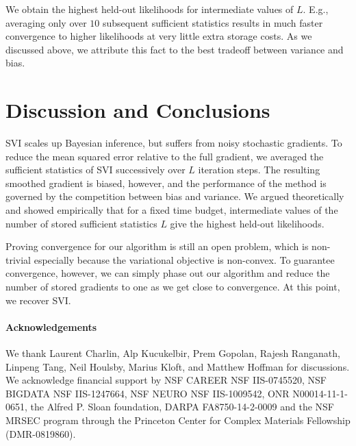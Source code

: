 \documentclass{article} %
\begin{document}
We obtain the highest held-out likelihoods for intermediate values of $L$. E.g., averaging only over $10$ subsequent sufficient statistics results in much faster convergence to higher likelihoods
at very little extra storage costs. As we discussed above, we attribute this fact to the best tradeoff between variance and bias.

\section{Discussion and Conclusions}
SVI scales up Bayesian inference, but suffers from noisy stochastic gradients.
To reduce the mean squared error relative to the full gradient, we averaged the sufficient statistics of SVI successively over $L$ iteration steps. The resulting smoothed gradient is biased, however, and the performance of the method
is governed by the competition between bias and variance. We argued theoretically and showed empirically that
for a fixed time budget, intermediate values of the number of stored sufficient statistics $L$ give the highest held-out likelihoods.

Proving convergence for our algorithm is still an open problem, which is non-trivial especially because the variational objective is non-convex.
To guarantee convergence, however, we can simply phase out our algorithm and reduce the number of stored gradients to one as we get close to convergence.  At this point, we recover SVI.

\paragraph{Acknowledgements} We thank Laurent Charlin, Alp Kucukelbir, Prem Gopolan, Rajesh Ranganath, Linpeng Tang, Neil Houlsby, Marius Kloft, and Matthew Hoffman
for discussions. We acknowledge financial support by NSF CAREER  NSF IIS-0745520, NSF BIGDATA  NSF IIS-1247664, NSF NEURO NSF IIS-1009542, ONR N00014-11-1-0651, the Alfred P. Sloan foundation, DARPA FA8750-14-2-0009 and the NSF MRSEC program through the Princeton Center for Complex Materials Fellowship (DMR-0819860).


\newpage


\end{document}
